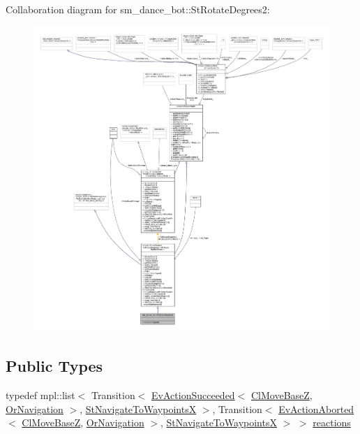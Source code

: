 Collaboration diagram for sm\+\_\+dance\+\_\+bot\+:\+:St\+Rotate\+Degrees2\+:
\nopagebreak
\begin{figure}[H]
\begin{center}
\leavevmode
\includegraphics[width=350pt]{structsm__dance__bot_1_1StRotateDegrees2__coll__graph}
\end{center}
\end{figure}
\subsection*{Public Types}
\begin{DoxyCompactItemize}
\item 
typedef mpl\+::list$<$ Transition$<$ \hyperlink{structsmacc_1_1default__events_1_1EvActionSucceeded}{Ev\+Action\+Succeeded}$<$ \hyperlink{classcl__move__base__z_1_1ClMoveBaseZ}{Cl\+Move\+BaseZ}, \hyperlink{classsm__dance__bot_1_1OrNavigation}{Or\+Navigation} $>$, \hyperlink{structsm__dance__bot_1_1StNavigateToWaypointsX}{St\+Navigate\+To\+WaypointsX} $>$, Transition$<$ \hyperlink{structsmacc_1_1default__events_1_1EvActionAborted}{Ev\+Action\+Aborted}$<$ \hyperlink{classcl__move__base__z_1_1ClMoveBaseZ}{Cl\+Move\+BaseZ}, \hyperlink{classsm__dance__bot_1_1OrNavigation}{Or\+Navigation} $>$, \hyperlink{structsm__dance__bot_1_1StNavigateToWaypointsX}{St\+Navigate\+To\+WaypointsX} $>$ $>$ \hyperlink{structsm__dance__bot_1_1StRotateDegrees2_ac78a9a21e3b11060f12b8403669e3dda}{reactions}
\end{DoxyCompactItemize}
